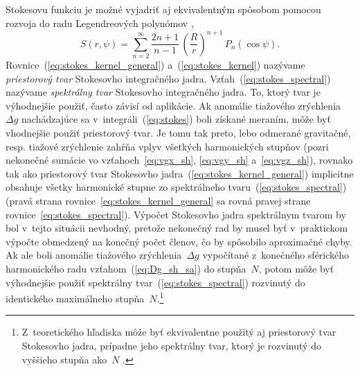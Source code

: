 \documentclass[a4paper,12pt]{book}
\begin{document}
Stokesovu funkciu je možné vyjadriť aj ekvivalentným spôsobom pomocou rozvoja 
do radu Legendreových polynómov \parencite{MoritzPhysicalGeodesy},
%
\begin{equation}
\label{eq:stokes_spectral}
S(r, \psi) = \sum_{n = 2}^{\infty} \frac{2n + 1}{n - 1} \, \left( \frac{R}{r} 
\right)^{n + 1} \, P_n(\cos\psi){.}
\end{equation}
%
Rovnice~(\ref{eq:stokes_kernel_general}) a~(\ref{eq:stokes_kernel}) nazývame 
\emph{priestorový tvar} Stokesovho integračného jadra.  
Vzťah~(\ref{eq:stokes_spectral}) nazývame \emph{spektrálny tvar} Stokesovho 
integračného jadra.  To, ktorý tvar je výhodnejšie použiť, často závisí od 
aplikácie.  Ak anomálie tiažového zrýchlenia~$\Delta g$ nachádzajúce sa 
v~integráli~(\ref{eq:stokes}) boli získané meraním, môže byť vhodnejšie použiť 
priestorový tvar.  Je tomu tak preto, lebo odmerané gravitačné, resp. tiažové 
zrýchlenie zahŕňa vplyv všetkých harmonických stupňov (pozri nekonečné sumácie 
vo vzťahoch~\ref{eq:vgx_sh}, \ref{eq:vgy_sh} a~\ref{eq:vgz_sh}), rovnako tak 
ako priestorový tvar Stokesovho jadra~(\ref{eq:stokes_kernel_general}) 
implicitne obsahuje všetky harmonické stupne zo spektrálneho 
tvaru~(\ref{eq:stokes_spectral}) (pravá strana 
rovnice~\ref{eq:stokes_kernel_general} sa rovná pravej strane 
rovnice~\ref{eq:stokes_spectral}).  Výpočet Stokesovho jadra spektrálnym tvarom 
by bol v~tejto situácii nevhodný, pretože nekonečný rad by musel byť 
v~praktickom výpočte obmedzený na konečný počet členov, čo by spôsobilo 
aproximačné chyby.  Ak ale boli anomálie tiažového zrýchlenia~$\Delta g$ 
vypočítané z~konečného sférického harmonického radu vzťahom~(\ref{eq:Dg_sh_sa}) 
do stupňa~$N$, potom môže byť výhodnejšie použiť spektrálny 
tvar~(\ref{eq:stokes_spectral}) rozvinutý do identického maximálneho 
stupňa~$N$.\footnote{Z~teoretického hľadiska môže byť ekvivalentne použitý aj 
priestorový tvar Stokesovho jadra, prípadne jeho spektrálny tvar, ktorý je 
rozvinutý do vyššieho stupňa ako~$N$ \parencite[pozri 
napríklad][]{Freeden2009}.}
\end{document}
